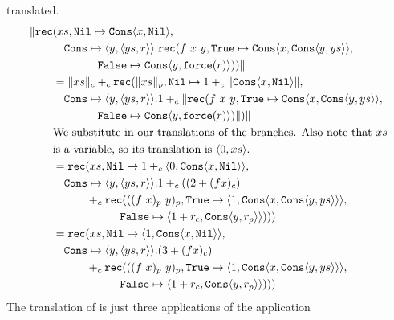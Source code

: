 translated.
%
\begin{align*}
  \|\texttt{rec}&(xs, \texttt{Nil} \mapsto \texttt{Cons} \langle x, \texttt{Nil}\rangle,\\
             &\quad \texttt{Cons}\mapsto \langle y, \langle ys,r \rangle\rangle.\texttt{rec}(f\ x\ y, \texttt{True}\mapsto \texttt{Cons}\langle x,\texttt{Cons}\langle y,ys \rangle\rangle, \\
             &\qquad\quad\quad \texttt{False}\mapsto \texttt{Cons}\langle y,\texttt{force}(r)\rangle))\| \\
             &= \|xs\|_c +_c \texttt{rec}(\|xs\|_p, \texttt{Nil} \mapsto 1 +_c \|\texttt{Cons} \langle x, \texttt{Nil}\rangle\|,\\
             &\quad \texttt{Cons}\mapsto \langle y, \langle ys,r \rangle\rangle. 1 +_c \|\texttt{rec}(f\ x\ y, \texttt{True}\mapsto \texttt{Cons}\langle x,\texttt{Cons}\langle y,ys \rangle\rangle, \\
             &\qquad\quad\quad \texttt{False}\mapsto \texttt{Cons}\langle y,\texttt{force}(r)\rangle)\|)\| \\
             &\text{We substitute in our translations of the branches. Also note that $xs$}\\
             &\text{is a variable, so its translation is $\langle 0,xs\rangle$.} \\
             &= \texttt{rec}(xs, \texttt{Nil} \mapsto 1 +_c \langle 0,\texttt{Cons}\langle x,\texttt{Nil}\rangle\rangle, \\
             &\quad \texttt{Cons}\mapsto \langle y, \langle ys,r \rangle\rangle. 1 +_c ((2 + (f x)_c) \\
             &\qquad\quad +_c \texttt{rec}(((f\ x)_p\ y)_p, \texttt{True}\mapsto \langle 1, \texttt{Cons}\langle x,\texttt{Cons}\langle y,ys\rangle\rangle\rangle, \\
             &\qquad\quad\quad\quad\quad \texttt{False}\mapsto \langle 1 + r_c, \texttt{Cons}\langle y,r_p\rangle\rangle))) \\
             &= \texttt{rec}(xs, \texttt{Nil} \mapsto \langle 1,\texttt{Cons}\langle x,\texttt{Nil}\rangle\rangle, \\
             &\quad \texttt{Cons}\mapsto \langle y, \langle ys,r \rangle\rangle. (3 + (f x)_c) \\
             &\qquad\quad +_c \texttt{rec}(((f\ x)_p\ y)_p, \texttt{True}\mapsto \langle 1, \texttt{Cons}\langle x,\texttt{Cons}\langle y,ys\rangle\rangle\rangle, \\
             &\qquad\quad\quad\quad\quad \texttt{False}\mapsto \langle 1 + r_c, \texttt{Cons}\langle y,r_p\rangle\rangle))) \\
\end{align*}
%
%
The translation of  is just three applications of the application
